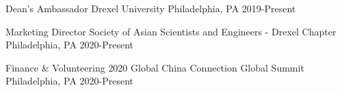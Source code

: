 

\begin{cvhonors}

  \cvhonor
  {Dean's Ambassador} %
  {Drexel University} %
  {Philadelphia, PA} %
  {2019-Present} %

  \cvhonor
  {Marketing Director} %
  {Society of Asian Scientists and Engineers - Drexel Chapter} %
  {Philadelphia, PA} %
  {2020-Present} %

  \cvhonor
  {Finance \& Volunteering} %
  {2020 Global China Connection Global Summit} %
  {Philadelphia, PA} %
  {2020-Present} %

\end{cvhonors}

